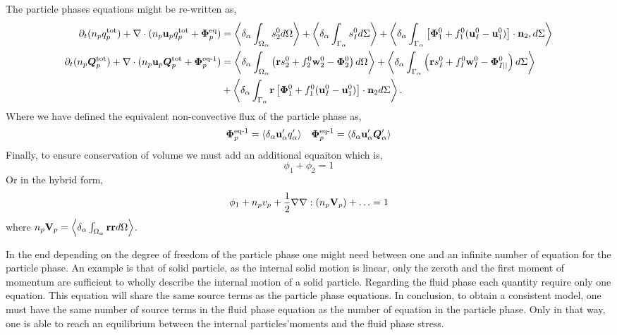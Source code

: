 The particle phases equations might be re-written as, 
\begin{align}
    \label{eq:dt_q_p_hybrid}
    \partial_t (n_p  q_p^\text{tot})
    + \mathbf{\nabla}\cdot (n_p\textbf{u}_p q_p^\text{tot} + \bm\Phi_p^\text{eq})
    &= \left<\delta_\alpha \int_{\Omega_\alpha}  s_2^0  d\Omega\right>
    + \left<\delta_\alpha \int_{\Gamma_\alpha}  s_I^0  d\Sigma\right>
    + \left<\delta_\alpha \int_{\Gamma_\alpha}  \left[\bm{\Phi}_1^0 + f_1^0 (\textbf{u}_I^0-\textbf{u}_1^0) \right] \cdot \textbf{n}_2 , d\Sigma\right>
    \\
    \label{eq:dt_Q_p_hybrid}
    \partial_t (n_p  \bm{Q}_p^\text{tot})
    + \mathbf{\nabla}\cdot (n_p \textbf{u}_p\bm{Q}_p^\text{tot}
    + \bm\Phi_p^\text{eq-1})
    &=\left<\delta_\alpha \int_{\Omega_\alpha}  \left(
        \textbf{r} s_2^0         
        + f_2^0  \textbf{w}_2^0 
        - \bm{\Phi}_2^0
    \right)  d\Omega\right>
    + \left<\delta_\alpha \int_{\Gamma_\alpha}  \left(
        \textbf{r}s_I^0
        + f_I^0 \textbf{w}_I^0
        - \bm{\Phi}_{I||}^0
    \right)  d\Sigma\right>\nonumber\\
    &+ \left<\delta_\alpha \int_{\Gamma_\alpha}  \textbf{r} \left[
        \bm{\Phi}_1^0
        + f_1^0 (\textbf{u}_I^0-\textbf{u}_1^0)
    \right]\cdot \textbf{n}_2   d\Sigma\right>.
\end{align}
Where we have defined the equivalent non-convective flux of the particle phase as, 
\begin{align*}
    \bm\Phi_p^\text{eq-1}= \left<\delta_\alpha \textbf{u}_\alpha' q_\alpha'\right>
    && \bm\Phi_p^\text{eq-1}= \left<\delta_\alpha \textbf{u}_\alpha' \bm{Q}_\alpha'\right>
\end{align*}
Finally, to ensure conservation of volume we must add an additional equaiton which is, 
\begin{equation}
    \phi_1 + \phi_2 = 1
\end{equation}
Or in the hybrid form, 
\begin{equation}
    \phi_1 + n_p v_p +\frac{1}{2} \mathbf{\nabla}\mathbf{\nabla} : (n_p \textbf{V}_p) + \ldots = 1
\end{equation}
where $n_p\textbf{V}_p = \left<\delta_\alpha \int_{\Omega_\alpha} \textbf{rr} d\Omega\right>$. 


In the end depending on the degree of freedom of the particle phase one might need between one and an infinite number of equation for the particle phase. 
An example is that of solid particle, as the internal solid motion is linear, only the zeroth and the first moment of momentum are sufficient to wholly describe the internal motion of a solid particle. 
Regarding the fluid phase each quantity require only one equation. 
This equation will share the same source terms as the particle phase equations. 
In conclusion, to obtain a consistent model, one must have the same number of source terms in the fluid phase equation as the number of equation in the particle phase. 
Only in that way, one is able to reach an equilibrium between the internal particles'moments and the fluid phase stress. 



